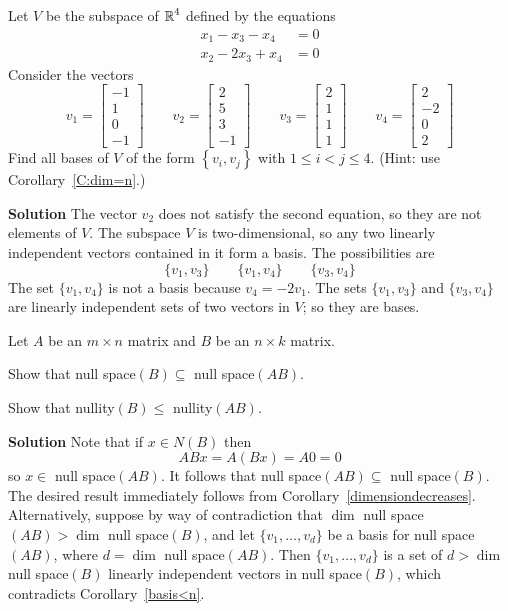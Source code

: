 \documentclass{ximera}
\begin{document}
\begin{exercise} \label{A5.6.1}
Let $V$ be the subspace of $\mbox{$\Bbb{R}$}^4$ defined by the equations
\begin{align*}
x_1-x_3-x_4&=0\\
x_2-2x_3+x_4&=0
\end{align*}
Consider the vectors
\[
v_1=\begin{bmatrix}-1\\1\\0\\-1\end{bmatrix} \qquad 
v_2=\begin{bmatrix}2\\5\\3\\-1\end{bmatrix} \qquad  
v_3=\begin{bmatrix}2\\1\\1\\1\end{bmatrix} \qquad  
v_4=\begin{bmatrix}2\\-2\\0\\2\end{bmatrix}
\]
Find all bases of $V$ of the form $\left\{v_i,v_j\right\}$ with $1\leq i< j\leq 4.$ (Hint: use Corollary~\ref{C:dim=n}.)

\textbf{Solution} The vector $v_2$ does not satisfy the second equation, so they are not elements of $V$.  
The subspace $V$ is two-dimensional, so any two linearly independent vectors contained in it form a basis. 
The possibilities are 
\[
\{v_1,v_3\} \qquad  \{v_1,v_4\} \qquad \{v_3,v_4\}
\]
The set $\{v_1,v_4\}$ is not a basis because $v_4= -2v_1$. The sets $\{v_1,v_3\}$ and $\{v_3,v_4\}$ are 
linearly independent sets of two vectors in $V$; so they are bases. 
\end{exercise}

\begin{exercise} \label{A5.6.1}
Let $A$ be an $m\times n$ matrix and $B$ be an $n\times k$ matrix. 
\begin{enumeratea}
\item Show that null space$(B) \subseteq$ null space$(AB)$.
\item Show that nullity$(B) \leq$ nullity$(AB)$.
\end{enumeratea}

\textbf{Solution}
Note that if $x\in N(B)$ then 
\[
ABx=A(Bx)=A0=0
\]
so $x\in$ null space$(AB)$. It follows that null space$(AB)\subseteq$ null space$(B)$. The desired result immediately follows from Corollary~\ref{dimensiondecreases}. Alternatively, suppose by way of contradiction that $\dim$ null space$(AB)>\dim$ null space$(B)$, and let $\{v_1,\ldots,v_d\}$ be a basis for null space$(AB)$, where $d=\dim$ null space$(AB)$. Then $\{v_1,\ldots,v_d \}$ is a set of $d>\dim$ null space$(B)$ linearly independent vectors in null space$(B)$, which contradicts Corollary~\ref{basis<n}.
\end{exercise}
\end{document}
